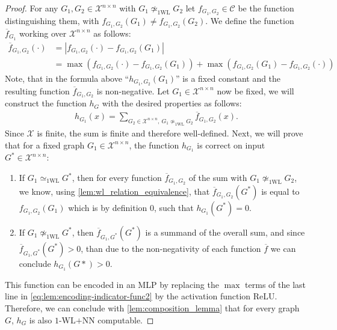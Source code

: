 \documentclass[11pt, dvipsnames, DIV=12]{scrreprt}
\theoremstyle{definition}
\newtheorem{lemma}[theorem]{Lemma}
\newcommand{\cC}{\mathcal{C}}
\newcommand{\cX}{\mathcal{X}}
\newcommand{\Rb}{\mathbb{R}}
\newcommand{\wlnn}{\text{1-WL+NN}}
\newcommand{\wliso}{\simeq_{\text{1WL}}}
\newcommand{\xnn}{\mathcal{X}^{n \times n}}
\newcommand{\wldisc}{\text{1-\!WL-Discriminating}}
\begin{document}

\begin{proof}
    For any $G_1, G_2 \in \xnn$ with $G_1 \not\wliso G_2$ let $f_{G_1, G_2} \in \cC$ be the function distinguishing them, with $f_{G_1, G_2}(G_1) \neq f_{G_1, G_2}(G_2)$. We define the function $\overline{f}_{G_1}$ working over $\xnn$ as follows:
    \begin{align}\label{eq:lem:encoding-indicator-func2}
        \overline{f}_{G_1, G_2}(\cdot) &= |f_{G_1, G_2}(\cdot) - f_{G_1, G_2}(G_1)| \nonumber \nonumber\\
        &= \max(f_{G_1, G_2}(\cdot) - f_{G_1, G_2}(G_1)) + \max(f_{G_1, G_2}(G_1) - f_{G_1, G_2}(\cdot))
    \end{align}
    Note, that in the formula above ``$h_{G_1, G_2}(G_1)$'' is a fixed constant and the resulting function $\overline{f}_{G_1, G_2}$ is non-negative.
    Let $G_1 \in \xnn$ now be fixed, we will construct the function $h_G$ with the desired properties as follows:
    \begin{align*}
        h_{G_1}(x) = \sum_{G_2 \in \xnn, \ G_1 \not\wliso G_2} \overline{f}_{G_1, G_2}(x).
    \end{align*}
    Since $\cX$ is finite, the sum is finite and therefore well-defined. Next, we will prove that for a fixed graph $G_1 \in \xnn$, the function $h_{G_1}$ is correct on input $G^* \in \xnn$:
    \begin{enumerate}
        \item If $G_1 \wliso G^*$, then for every function $\overline{f}_{G_1, G_2}$ of the sum with $G_1 \not\wliso G_2$, we know, using \cref{lem:wl_relation_equivalence}, that $\overline{f}_{G_1, G_2}(G^*)$ is equal to $f_{G_1, G_2}(G_1)$ which is by definition $0$, such that $h_{G_1}(G^*) = 0$.
        \item If $G_1 \not\wliso G^*$, then $\overline{f}_{G_1, G^*}(G^*)$ is a summand of the overall sum, and since $\overline{f}_{G_1, G^*}(G^*) > 0$, than due to the non-negativity of each function $\overline{f}$ we can conclude $h_{G_1}(G*) > 0$.
    \end{enumerate}

    This function can be encoded in an MLP by replacing the $\max$ terms of the last line in \autoref{eq:lem:encoding-indicator-func2} by the activation function ReLU. Therefore, we can conclude with \cref{lem:composition_lemma} that for every graph $G$, $h_G$ is also $\wlnn$ computable.
\end{proof}
\end{document}
